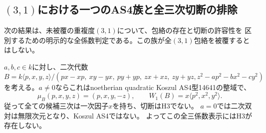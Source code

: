 \subsection{$(3,1)$における一つのAS4族と全三次切断の排除}
\label{subsec:h3-positive3-binormal}
次の結果は、未被覆の重複度$(3,1)$について、包絡の存在と切断の許容性を
区別するための明示的な全係数判定である。この族が全$(3,1)$包絡を被覆するとはしない。

\begin{proposition}\label{prop:h3-positive3-binormal-exclusion}
$a,b,c\in k$に対し、二次代数
\[
 B=k\langle p,x,y,z\rangle/
 (px-xp,\ xy-yx,\ py+yp,\ zx+xz,\ zy+yz,
 z^2-ap^2-bx^2-cy^2)
\]
を考える。$a\ne0$ならこれはnoetherian quadratic Koszul AS4型14641の整域で、
\[
 \mu_B(p,x,y,z)=(p,x,y,-z),\qquad
 W_1(B)=x\langle p^2,x^2,y^2\rangle.
\]
従って全ての候補三次は一次因子$x$を持ち、切断はH3でない。
$a=0$では二次双対は無限次元となり、Koszul AS4ではない。
よってこの全三係数表示にはH3が存在しない。
\end{proposition}
